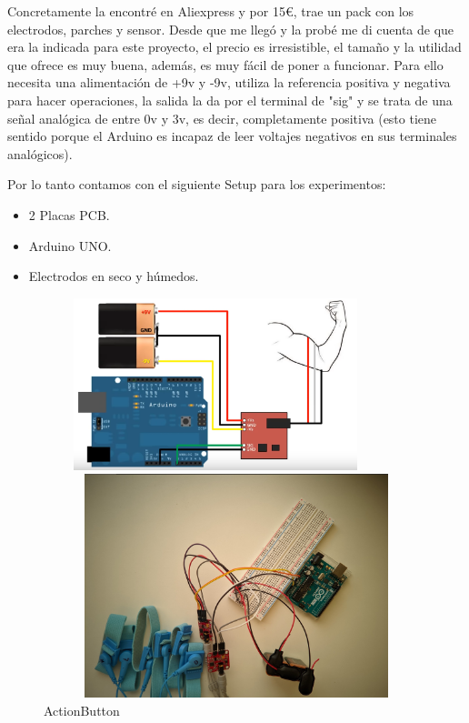Concretamente la encontré en Aliexpress y por 15€, trae un pack con los electrodos, parches y sensor. Desde que me llegó y la probé me di cuenta de que era la indicada para este proyecto, el precio es irresistible, el tamaño y la utilidad que ofrece es muy buena, además, es muy fácil de poner a funcionar. Para ello necesita una alimentación de +9v y -9v, utiliza la referencia positiva y negativa para hacer operaciones, la salida la da por el terminal de "sig" y se trata de una señal analógica de entre 0v y 3v, es decir, completamente positiva (esto tiene sentido porque el Arduino es incapaz de leer voltajes negativos en sus terminales analógicos).    
\vspace{0.15cm}

Por lo tanto contamos con el siguiente Setup para los experimentos:
\begin{itemize}
  \item 2 Placas PCB.
  \item Arduino UNO.
  \item Electrodos en seco y húmedos.
\end{itemize}

\begin{figure}[hp!]
\begin{center}
    \includegraphics[width=100mm, height=5cm, scale=0.5]{imaxes/montaje.png}
    
    \includegraphics[width=12.5cm, height=6.5cm, scale=0.5]{imaxes/configuracion.png}
    \caption{ActionButton}
    \label{ActionButton}
  \end{center}
\end{figure}

